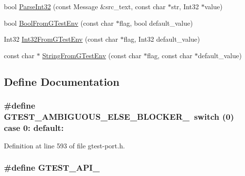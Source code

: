 \begin{DoxyCompactItemize}
bool \hyperlink{namespacetesting_1_1internal_a3bd151d0274b216f9c2e6275ccc4a9a3}{\-Parse\-Int32} (const \-Message \&src\-\_\-text, const char $\ast$str, \-Int32 $\ast$value)
\item 
bool \hyperlink{namespacetesting_1_1internal_af17bf74326e1076c47455ef2618c1a1a}{\-Bool\-From\-G\-Test\-Env} (const char $\ast$flag, bool default\-\_\-value)
\item 
\-Int32 \hyperlink{namespacetesting_1_1internal_a960e275ac93c373f223887e57ec54381}{\-Int32\-From\-G\-Test\-Env} (const char $\ast$flag, \-Int32 default\-\_\-value)
\item 
const char $\ast$ \hyperlink{namespacetesting_1_1internal_a0154be115eea16783f82d3642ff27940}{\-String\-From\-G\-Test\-Env} (const char $\ast$flag, const char $\ast$default\-\_\-value)
\end{DoxyCompactItemize}


\subsection{\-Define \-Documentation}
\hypertarget{gtest-port_8h_a00b3684a621ce1422b55a0e7e8a6aecb}{
\subsubsection[{\-G\-T\-E\-S\-T\-\_\-\-A\-M\-B\-I\-G\-U\-O\-U\-S\-\_\-\-E\-L\-S\-E\-\_\-\-B\-L\-O\-C\-K\-E\-R\-\_\-}]{\setlength{\rightskip}{0pt plus 5cm}\#define {\bf \-G\-T\-E\-S\-T\-\_\-\-A\-M\-B\-I\-G\-U\-O\-U\-S\-\_\-\-E\-L\-S\-E\-\_\-\-B\-L\-O\-C\-K\-E\-R\-\_\-}~switch (0) case 0\-: default\-:}}\label{d3/dc9/gtest-port_8h_a00b3684a621ce1422b55a0e7e8a6aecb}


\-Definition at line 593 of file gtest-\/port.\-h.

\hypertarget{gtest-port_8h_aa73be6f0ba4a7456180a94904ce17790}{
\subsubsection[{\-G\-T\-E\-S\-T\-\_\-\-A\-P\-I\-\_\-}]{\setlength{\rightskip}{0pt plus 5cm}\#define {\bf \-G\-T\-E\-S\-T\-\_\-\-A\-P\-I\-\_\-}}}\label{d3/dc9/gtest-port_8h_aa73be6f0ba4a7456180a94904ce17790}


